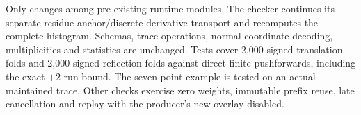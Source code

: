 Only  changes among pre-existing runtime modules.
The checker continues its separate residue-anchor/discrete-derivative
transport and recomputes the complete histogram. Schemas, trace operations,
normal-coordinate decoding, multiplicities and statistics are unchanged.
Tests cover 2,000 signed translation folds and 2,000 signed reflection folds
against direct finite pushforwards, including the exact $+2$ run bound.
The seven-point example is tested on an actual maintained trace. Other checks
exercise zero weights, immutable prefix reuse, late cancellation and replay
with the producer's new overlay disabled.


